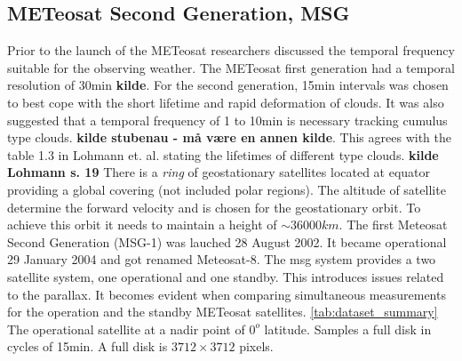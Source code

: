 \subsection{METeosat Second Generation, MSG} \label{sec:meteosat}
Prior to the launch of the METeosat researchers discussed the temporal frequency suitable for the observing weather. The METeosat first generation had a temporal resolution of 30min \textbf{kilde}. For the second generation, 15min intervals was chosen to best cope with the short lifetime and rapid deformation of clouds. It was also suggested that a temporal frequency of 1 to 10min is necessary tracking cumulus type clouds. \textbf{kilde stubenau - må være en annen kilde}. This agrees with the table 1.3 in Lohmann et. al. stating the lifetimes of different type clouds. \textbf{kilde Lohmann s. 19} There is a \textit{ring} of geostationary satellites located at equator providing a global covering (not included polar regions). The altitude of satellite determine the forward velocity and is chosen for the geostationary orbit. To achieve this orbit it needs to maintain a height of $\sim 36 000km $. The first Meteosat Second Generation (MSG-1) was lauched 28 August 2002. It became operational 29 January 2004 and got renamed Meteosat-8. The \acrshort{msg} system provides a two satellite system, one operational and one standby. This introduces issues related to the parallax. It becomes evident when comparing simultaneous measurements for the operation and the standby METeosat satellites. \ref{tab:dataset_summary} The operational satellite at a nadir point of $0^o$ latitude. Samples a full disk in cycles of 15min. A full disk is $3712\times 3712$ pixels.
